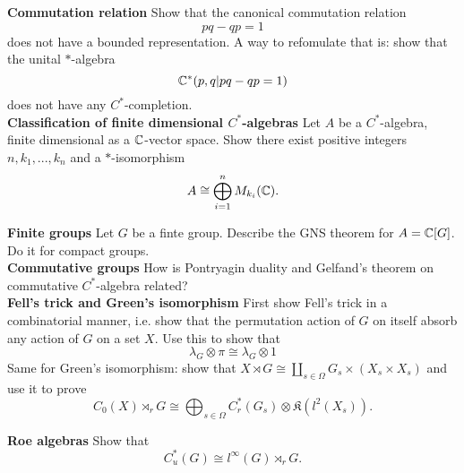 \textbf{Commutation relation} Show that the canonical commutation relation \[ pq-qp = 1\]
does not have a bounded representation. A way to refomulate that is: show that the unital $*$-algebra 
\[ \mathbb C^*( p,q | pq-qp =1)\]
does not have any $C^*$-completion.\\

\textbf{Classification of finite dimensional $C^*$-algebras} Let $A$ be a $C^*$-algebra, finite dimensional as a $\mathbb C$-vector space. Show there exist positive integers $n,k_1,...,k_n$ and a $*$-isomorphism
\[A\cong \bigoplus_{i=1}^n M_{k_i}(\mathbb C).\]

\textbf{Finite groups} Let $G$ be a finte group. Describe the GNS theorem for $A=\mathbb C[G]$. Do it for compact groups.\\

\textbf{Commutative groups} How is Pontryagin duality and Gelfand's theorem on commutative $C^*$-algebra related?\\

\textbf{Fell's trick and Green's isomorphism}
First show Fell's trick in a combinatorial manner, i.e. show that the permutation action of $G$ on itself absorb any action of $G$ on a set $X$. Use this to show that 
\[\lambda_G \otimes \pi \cong \lambda_G \otimes 1\]
Same for Green's isomorphism: show that $X\rtimes G \cong \coprod_{s\in \Omega} G_s\times (X_s\times X_s)$ and use it to prove
\[C_0(X)\rtimes_r G \cong \bigoplus_{s\in \Omega} C^*_r(G_s)\otimes \mathfrak K(l^2(X_s)). \]

\textbf{Roe algebras}
Show that 
\[C^*_u(G) \cong l^\infty(G)\rtimes_r G.\]

 
